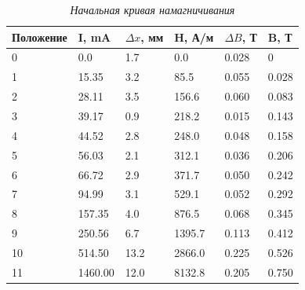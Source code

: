 \documentclass[a4paper,12pt]{article}
\begin{document}
\FloatBarrier
\begin{table}[]
    \centering
    \caption{\textit{Начальная кривая намагничивания}}
    \begin{tabular}{|l|l|l|l|l|l|}
        \hline
        Положение & I, mA   & $\Delta x$, мм & H, А/м & $\Delta B$, Т              & B, Т  \\ \hline
        0        & 0.0 & 1.7    & 0.0    & 0.028 & 0     \\ \hline
        1        & 15.35  & 3.2    & 85.5   & 0.055 & 0.028 \\ \hline
        2        & 28.11  & 3.5    & 156.6  & 0.060 & 0.083 \\ \hline
        3        & 39.17  & 0.9    & 218.2  & 0.015 & 0.143 \\ \hline
        4        & 44.52  & 2.8    & 248.0  & 0.048 & 0.158 \\ \hline
        5        & 56.03   & 2.1    & 312.1  & 0.036 & 0.206 \\ \hline
        6        & 66.72   & 2.9    & 371.7  & 0.050 & 0.242 \\ \hline
        7        & 94.99   & 3.1    & 529.1  & 0.052 & 0.292 \\ \hline
        8        & 157.35  & 4.0    & 876.5  & 0.068 & 0.345 \\ \hline
        9        & 250.56  & 6.7    & 1395.7 & 0.113  & 0.412 \\ \hline
        10       & 514.50   & 13.2   & 2866.0 & 0.225  & 0.526 \\ \hline
        11       & 1460.00    & 12.0   & 8132.8 & 0.205  & 0.750 \\ \hline
    \end{tabular}
\end{table}
\FloatBarrier

\FloatBarrier
\end{document}
